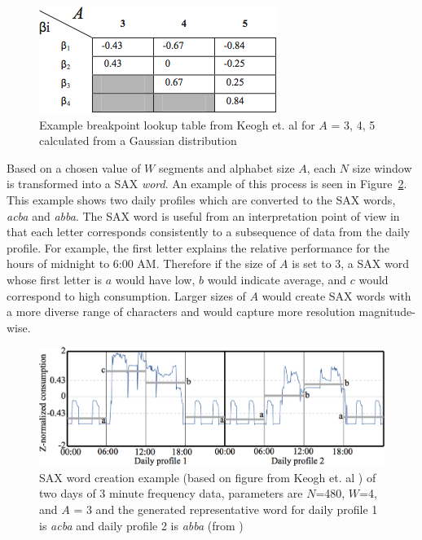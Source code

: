 \begin{figure}[ht!]
\begin{center}
\includegraphics[width=0.42\columnwidth]{figures/SAXBreakpoints/SAXBreakpoints}
\caption{Example breakpoint lookup table from Keogh et. al \citep{keogh_hot_2005} for $A$ = 3, 4, 5 calculated from a Gaussian distribution \citep{miller_automated_2015}
\label{fig:SAXBreakpoints}%
}
\end{center}
\end{figure}

Based on a chosen value of $W$ segments and alphabet size $A$, each $N$ size window is transformed into a SAX \emph{word}. An example of this process is seen in Figure~\ref{fig:SAXWord}. This example shows two daily profiles which are converted to the SAX words, \emph{acba} and \emph{abba}. The SAX word is useful from an interpretation point of view in that each letter corresponds consistently to a subsequence of data from the daily profile. For example, the first letter explains the relative performance for the hours of midnight to 6:00 AM. Therefore if the size of $A$ is set to 3, a SAX word whose first letter is $a$ would have low, $b$ would indicate average, and $c$ would correspond to high consumption. Larger sizes of $A$ would create SAX words with a more diverse range of characters and would capture more resolution magnitude-wise.

\begin{figure}[ht!]
\begin{center}
\includegraphics[width=0.7\columnwidth]{figures/SAXCreationV2/SAXCreationV2}
\caption{SAX word creation example (based on figure from Keogh et. al \citep{keogh_hot_2005}) of two days of 3 minute frequency data, parameters are $N$=480, $W$=4, and $A$ = 3 and the generated representative word for daily profile 1 is \emph{acba} and daily profile 2 is \emph{abba} (from \citep{miller_automated_2015})
\label{fig:SAXWord}%
}
\end{center}
\end{figure}

